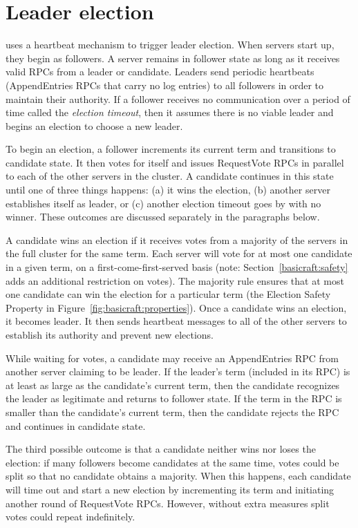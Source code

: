 \section{Leader election}
\label{basicraft:leaderelection}

\name{} uses a heartbeat mechanism to trigger leader election.
When servers start up, they begin
as followers. A server remains in follower state as long as it
receives valid RPCs from a leader or candidate. Leaders send periodic
heartbeats (AppendEntries RPCs that carry no log entries) to all
followers in order to maintain their authority. If a follower
receives no communication over a
period of time called the \emph{election timeout}, then
it assumes there is no viable leader and
begins an election to choose a new leader.



To begin an election, a follower increments its current term and
transitions to candidate state. It then votes for itself and issues RequestVote RPCs in
parallel to each of the other servers in the cluster.
A candidate continues in this state until one of three things
happens: (a) it wins the election, (b) another server establishes
itself as leader, or (c) another
election timeout goes by with no winner.
These outcomes are discussed separately in the paragraphs below.

A candidate wins an election if it receives votes from a majority
of the servers in the full cluster for the same term. Each server will
vote for at most one candidate in a given term, on a
first-come-first-served basis (note: Section~\ref{basicraft:safety} adds
an additional restriction on votes). The
majority rule ensures that at most one candidate can win
the election for a particular term (the Election Safety Property
in Figure~\ref{fig:basicraft:properties}).
Once a candidate wins an election, it becomes leader.
It then sends heartbeat messages to
all of the other servers to establish its authority and prevent new elections.

While waiting for votes, a candidate may receive an AppendEntries RPC
from another server claiming to be leader. If the leader's term
(included in its RPC) is at least as large as the candidate's
current term, then the candidate recognizes the leader as legitimate
and returns to follower state.
If the term in the RPC is smaller than the candidate's current term,
then the candidate rejects the RPC and continues in candidate state.

The third possible outcome is that a candidate neither wins nor loses
the election:
if many followers become candidates at the same time, votes could be
split so that no candidate obtains a majority. When this happens,
each candidate will time out and start
a new election by incrementing its term and initiating another round
of RequestVote RPCs. However, without extra measures
split votes could repeat indefinitely.

